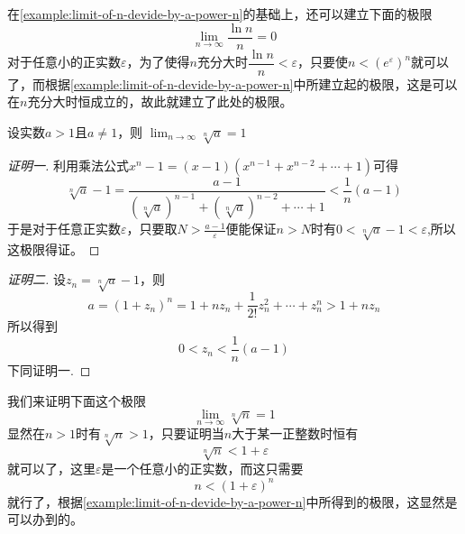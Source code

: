 \begin{example}
  \label{example:limit-of-lnn-devide-by-n}
  在\autoref{example:limit-of-n-devide-by-a-power-n}的基础上，还可以建立下面的极限
  \[ \lim_{n \to \infty} \frac{\ln{n}}{n} = 0 \]
  对于任意小的正实数$\varepsilon$，为了使得$n$充分大时$\dfrac{\ln{n}}{n} < \varepsilon$，只要使$n<(e^{\varepsilon})^n$就可以了，而根据\autoref{example:limit-of-n-devide-by-a-power-n}中所建立起的极限，这是可以在$n$充分大时恒成立的，故此就建立了此处的极限。
\end{example}

\begin{example}
  \label{example:limit-of-n-sqrt-a-when-a-greater-than-1}
  设实数$a>1$且$a \neq 1$，则 $\lim_{n \to \infty} \sqrt[n]{a} = 1$

  \begin{proof}[证明一]
    利用乘法公式$x^n-1=(x-1)(x^{n-1}+x^{n-2}+\cdots+1)$可得
    \[ \sqrt[n]{a}-1 = \frac{a-1}{(\sqrt[n]{a})^{n-1}+(\sqrt[n]{a})^{n-2}+\cdots+1} < \frac{1}{n}(a-1) \]
   于是对于任意正实数$\varepsilon$，只要取$N>\frac{a-1}{\varepsilon}$便能保证$n>N$时有$0<\sqrt[n]{a}-1<\varepsilon$,所以这极限得证。
  \end{proof}

  \begin{proof}[证明二]
    设$z_n=\sqrt[n]{a}-1$，则
    \[ a = (1+z_n)^n = 1+ nz_n+\frac{1}{2!}z_n^2+\cdots+z_n^n > 1+ n z_n \]
    所以得到
    \[ 0<z_n<\frac{1}{n}(a-1) \]
    下同证明一.
  \end{proof}
\end{example}

\begin{example}
  我们来证明下面这个极限
  \[ \lim_{n \to \infty} \sqrt[n]{n} = 1 \]
  显然在$n>1$时有$\sqrt[n]{n}>1$，只要证明当$n$大于某一正整数时恒有
  \[ \sqrt[n]{n}<1+\varepsilon \]
  就可以了，这里$\varepsilon$是一个任意小的正实数，而这只需要
  \[ n < (1+\varepsilon)^n \]
  就行了，根据\autoref{example:limit-of-n-devide-by-a-power-n}中所得到的极限，这显然是可以办到的。
\end{example}

